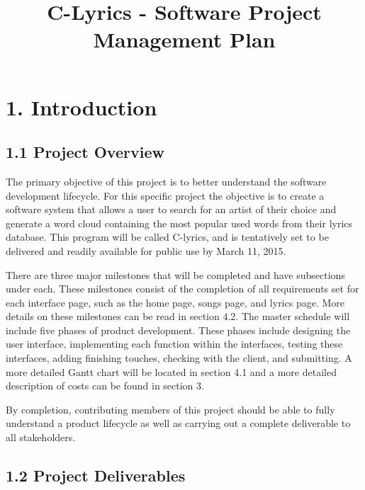 \documentclass[]{article}
\author{}
\date{}
\begin{document}
\title{C-Lyrics - Software Project Management Plan}

\section{1. Introduction}\label{introduction}

\subsection{1.1 Project Overview}\label{project-overview}

The primary objective of this project is to better understand the
software development lifecycle. For this specific project the objective
is to create a software system that allows a user to search for an
artist of their choice and generate a word cloud containing the most
popular used words from their lyrics database. This program will be
called C-lyrics, and is tentatively set to be delivered and readily
available for public use by March 11, 2015.

There are three major milestones that will be completed and have
subsections under each. These milestones consist of the completion of
all requirements set for each interface page, such as the home page,
songs page, and lyrics page. More details on these milestones can be
read in section 4.2. The master schedule will include five phases of
product development. These phases include designing the user interface,
implementing each function within the interfaces, testing these
interfaces, adding finishing touches, checking with the client, and
submitting. A more detailed Gantt chart will be located in section 4.1
and a more detailed description of costs can be found in section 3.

By completion, contributing members of this project should be able to
fully understand a product lifecycle as well as carrying out a complete
deliverable to all stakeholders.

\subsection{1.2 Project Deliverables}\label{project-deliverables}
\end{document}
